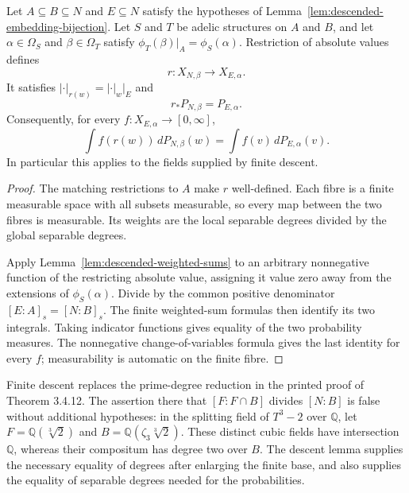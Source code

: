 \begin{lemma}
\label{lem:descended-base-change}
\leanok
{}
Let $A\subseteq B\subseteq N$ and $E\subseteq N$ satisfy the hypotheses
of Lemma~\ref{lem:descended-embedding-bijection}. Let $S$ and $T$ be
adelic structures on $A$ and $B$, and let $\alpha\in\Omega_S$ and
$\beta\in\Omega_T$ satisfy $\phi_T(\beta)|_A=\phi_S(\alpha)$.
Restriction of absolute values defines
\[
 r:X_{N,\beta}\longrightarrow X_{E,\alpha}.
\]
It satisfies $|\cdot|_{r(w)}=|\cdot|_w|_E$ and
\[
 r_*P_{N,\beta}=P_{E,\alpha}.
\]
Consequently, for every $f:X_{E,\alpha}\to[0,\infty]$,
\[
 \int f(r(w))\,dP_{N,\beta}(w)=\int f(v)\,dP_{E,\alpha}(v).
\]
In particular this applies to the fields supplied by finite descent.
\end{lemma}
\begin{proof}
The matching restrictions to $A$ make $r$ well-defined. Each fibre is
a finite measurable space with all subsets measurable, so every map
between the two fibres is measurable. Its weights are the local
separable degrees divided by the global separable degrees.

Apply Lemma~\ref{lem:descended-weighted-sums} to an arbitrary
nonnegative function of the restricting absolute value, assigning it
value zero away from the extensions of $\phi_S(\alpha)$.
Divide by the common positive denominator $[E:A]_s=[N:B]_s$.
The finite weighted-sum formulas then identify its two integrals.
Taking indicator functions gives equality of the two probability
measures. The nonnegative change-of-variables formula gives the last
identity for every $f$; measurability is automatic on the finite fibre.
\end{proof}

\begin{remark}\label{rem:algebraic-tower-source-repair}
Finite descent replaces the prime-degree reduction in the printed
proof of Theorem 3.4.12. The assertion there that
$[F:F\cap B]$ divides $[N:B]$ is false without additional hypotheses:
in the splitting field of $T^3-2$ over $\mathbb Q$, let
$F=\mathbb Q(\sqrt[3]2)$ and
$B=\mathbb Q(\zeta_3\sqrt[3]2)$. These distinct cubic fields have
intersection $\mathbb Q$, whereas their compositum has degree two
over $B$. The descent lemma supplies the necessary equality of
degrees after enlarging the finite base, and also supplies the
equality of separable degrees needed for the probabilities.
\end{remark}

